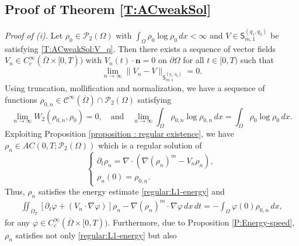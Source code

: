 \documentclass{amsart}
\numberwithin{equation}{section}
\newcommand{\calC}{{ \mathcal C  }}
\begin{document}
\subsection{Proof of Theorem \ref{T:ACweakSol}}
{\it Proof of (i).} Let $\rho_0\in  \mathcal{P}_2(\Omega) $ with $\int_{\Omega}\rho_0 \log \rho_0 \,dx < \infty$ and 
$V \in  \mathsf{S}_{m,1}^{(q_1,q_2)} $ be satisfying \eqref{T:ACweakSol:V_q}.
Then there exists a sequence of vector fields $V_n\in C^\infty_c(\overline{\Omega}\times[0,T)) $ with $V_n(t)\cdot \mathbf{n}=0$ on $\partial\Omega$ for all $t\in[0,T)$
such that
\begin{equation}\label{eq7 : Theorem-1}
\lim_{n \rightarrow \infty}\|V_n - V \|_{\mathsf{S}_{m,1}^{(q_1,q_2)} } =0.
\end{equation}
Using truncation, mollification and normalization, we have a sequence of functions
$\rho_{0,n}\in \calC^\infty(\overline{\Omega})\cap \mathcal{P}_2(\Omega)$ satisfying
\begin{equation}\label{eq9 : Theorem-1}
\lim_{n \rightarrow \infty} W_2(\rho_{0,n} , \rho_0) =0,
\quad \text{and} \quad  \lim_{n \rightarrow \infty} \int_{\Omega} \rho_{0,n} \log \rho_{0,n} \,dx = \int_{\Omega} \rho_0\log \rho_{0} \,dx.
\end{equation}
Exploiting Proposition \ref{proposition : regular existence}, we have $\rho_n\in AC(0,T; \mathcal{P}_2(\Omega))$ which is a regular solution of
\begin{equation}\label{eq5 : Theorem-1}
\begin{cases}
   \partial_t \rho_n =   \nabla \cdot( \nabla (\rho_n)^m  - V_n\rho_n),\\
   \rho_n(0)=\rho_{0,n}.
 \end{cases}
\end{equation}
Thus, $\rho_n$ satisfies the energy estimate \eqref{regular:L1-energy} and 
\begin{equation}\label{eq21 : Theorem-1}
\begin{aligned}
\iint_{\Omega_T}  \left [\partial_t\varphi + (V_n \cdot \nabla \varphi )\right ]\rho_n
 - \nabla(\rho_n)^m \cdot \nabla \varphi  \,dx\,dt
 =  - \int_{\Omega}\varphi(0) \rho_{0,n}\,dx,
\end{aligned}
\end{equation}
for any $\varphi\in C_c^\infty( \overline{\Omega} \times [0,T))$. Furthermore, due to Proposition \ref{P:Energy-speed}, $\rho_n$  satisfies not only \eqref{regular:L1-energy}  but also 
\end{document}
